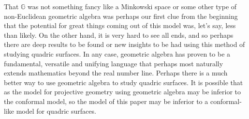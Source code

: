 \documentclass{birkjour}
\theoremstyle{definition}
\theoremstyle{remark}
\numberwithin{equation}{section}
\newcommand{\G}{\mathbb{G}}
\begin{document}
That $\G$ was not something fancy like a Minkowski space or some other
type of non-Euclidean geometric algebra was perhaps our first clue from
the beginning that the potential for great things coming out of this model
was, let's say, less than likely.  On the other hand, it is very hard to see
all ends, and so perhaps there are deep results to be found or new insights
to be had using this method of studying quadric surfaces.  In any case,
geometric algebra has proven to be a fundamental, versatile and unifying
language that perhaps most naturally extends mathematics beyond the real number line.  Perhaps
there is a much better way to use geometric algebra to study quadric surfaces.
It is possible that as the model for projective geometry using geometric algebra may
be inferior to the conformal model, so the model of this paper may be inferior to
a conformal-like model for quadric surfaces.



\end{document}
